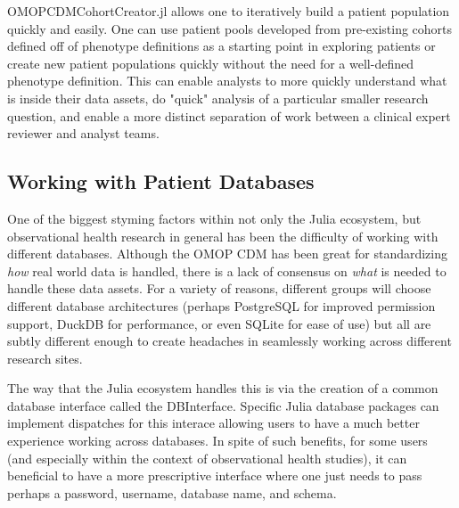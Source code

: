 \documentclass{juliacon}
\begin{document}
OMOPCDMCohortCreator.jl allows one to iteratively build a patient population quickly and easily.
One can use patient pools developed from pre-existing cohorts defined off of phenotype definitions as a starting point in exploring patients or create new patient populations quickly without the need for a well-defined phenotype definition.
This can enable analysts to more quickly understand what is inside their data assets, do "quick" analysis of a particular smaller research question, and enable a more distinct separation of work between a clinical expert reviewer and analyst teams.

\subsection{Working with Patient Databases}

One of the biggest styming factors within not only the Julia ecosystem, but observational health research in general has been the difficulty of working with different databases.\cite{zelko2023julia}
Although the OMOP CDM has been great for standardizing \textit{how} real world data is handled, there is a lack of consensus on \textit{what} is needed to handle these data assets.
For a variety of reasons, different groups will choose different database architectures (perhaps PostgreSQL for improved permission support, DuckDB for performance, or even SQLite for ease of use) but all are subtly different enough to create headaches in seamlessly working across different research sites.

The way that the Julia ecosystem handles this is via the creation of a common database interface called the DBInterface.
Specific Julia database packages can implement dispatches for this interace allowing users to have a much better experience working across databases.
In spite of such benefits, for some users (and especially within the context of observational health studies), it can beneficial to have a more prescriptive interface where one just needs to pass perhaps a password, username, database name, and schema.
\end{document}
